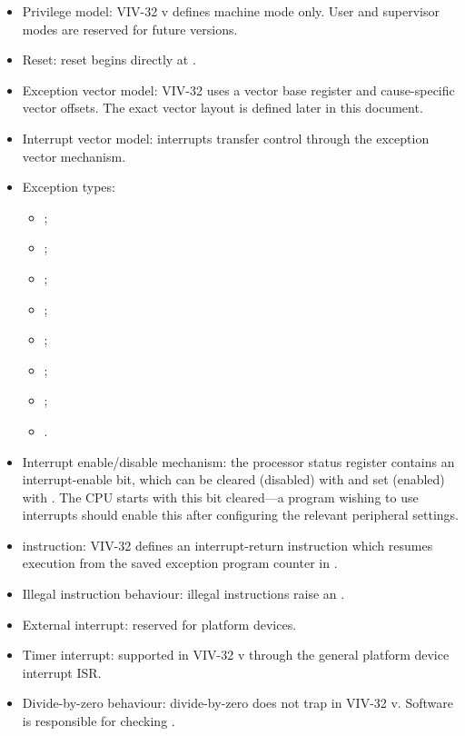 \begin{itemize}
  \item Privilege model: VIV-32 v\version{} defines machine mode only. User and
        supervisor modes are reserved for future versions.
  \item Reset: reset begins directly at .
  \item Exception vector model: VIV-32 uses a vector base register
         and cause-specific vector offsets. The exact vector
        layout is defined later in this document.
  \item Interrupt vector model: interrupts transfer control through the
        exception vector mechanism.
  \item Exception types:

        \begin{itemize}
          \item {};
          \item {};
          \item {};
          \item {};
          \item {};
          \item {};
          \item {};
          \item {}.
        \end{itemize}
        
  \item Interrupt enable/disable mechanism: the processor status register
        contains an interrupt-enable bit, which can be cleared (disabled) with
         and set (enabled) with . The CPU starts with this
        bit cleared---a program wishing to use interrupts should enable this
        after configuring the relevant peripheral settings.
  \item {} instruction: VIV-32 defines an interrupt-return instruction
        which resumes execution from the saved exception program counter in
        .
  \item Illegal instruction behaviour: illegal instructions raise an
        .
  \item External interrupt: reserved for platform devices.
  \item Timer interrupt: supported in VIV-32 v\version{} through the general
        platform device interrupt ISR.
  \item Divide-by-zero behaviour: divide-by-zero does not trap in VIV-32
        v\version{}. Software is responsible for checking .
\end{itemize}

